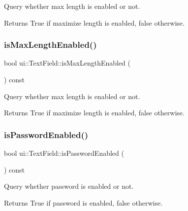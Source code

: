 Query whether max length is enabled or not. 

\begin{DoxyReturn}{Returns}
True if maximize length is enabled, false otherwise. 
\end{DoxyReturn}
\mbox{\label{classui_1_1TextField_af1c9a7bd43a96e69cda3a2ab4e93758b}} 
\subsubsection{\texorpdfstring{is\+Max\+Length\+Enabled()}{isMaxLengthEnabled()}\hspace{0.1cm}{\footnotesize\ttfamily [2/2]}}
{\footnotesize\ttfamily bool ui\+::\+Text\+Field\+::is\+Max\+Length\+Enabled (\begin{DoxyParamCaption}{ }\end{DoxyParamCaption}) const}



Query whether max length is enabled or not. 

\begin{DoxyReturn}{Returns}
True if maximize length is enabled, false otherwise. 
\end{DoxyReturn}
\mbox{\label{classui_1_1TextField_afc35114b2c350de28a400baeb2c56b8f}} 
\subsubsection{\texorpdfstring{is\+Password\+Enabled()}{isPasswordEnabled()}\hspace{0.1cm}{\footnotesize\ttfamily [1/2]}}
{\footnotesize\ttfamily bool ui\+::\+Text\+Field\+::is\+Password\+Enabled (\begin{DoxyParamCaption}{ }\end{DoxyParamCaption}) const}



Query whether password is enabled or not. 

\begin{DoxyReturn}{Returns}
True if password is enabled, false otherwise. 
\end{DoxyReturn}
\mbox{\label{classui_1_1TextField_afc35114b2c350de28a400baeb2c56b8f}} 
